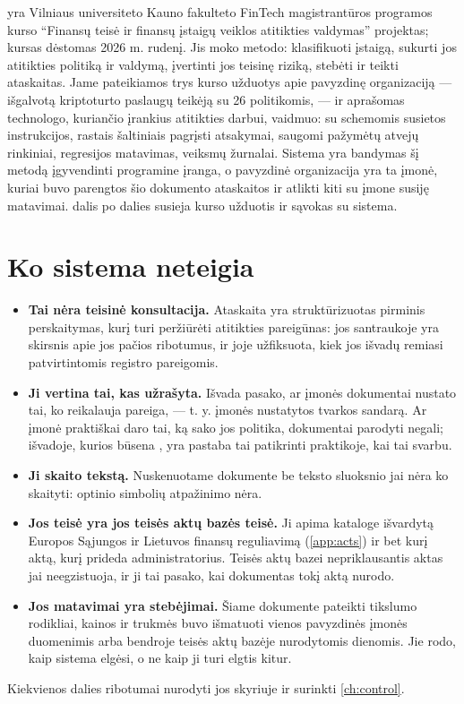 \product{} yra Vilniaus universiteto Kauno fakulteto FinTech magistrantūros programos kurso
\enquote{Finansų teisė ir finansų įstaigų veiklos atitikties valdymas} projektas; kursas dėstomas
2026 m. rudenį. Jis moko metodo: klasifikuoti įstaigą, sukurti jos atitikties politiką ir
valdymą, įvertinti jos teisinę riziką, stebėti ir teikti ataskaitas. Jame pateikiamos trys
kurso užduotys apie pavyzdinę organizaciją \demo{} --- išgalvotą kriptoturto paslaugų teikėją
su 26 politikomis, --- ir aprašomas technologo, kuriančio įrankius atitikties darbui,
vaidmuo: su schemomis susietos instrukcijos, rastais šaltiniais pagrįsti atsakymai, saugomi
pažymėtų atvejų rinkiniai, regresijos matavimas, veiksmų žurnalai. Sistema yra bandymas šį
metodą įgyvendinti programine įranga, o pavyzdinė organizacija yra ta įmonė, kuriai buvo
parengtos šio dokumento ataskaitos ir atlikti kiti su įmone susiję matavimai.
 dalis po dalies susieja kurso užduotis ir sąvokas su sistema.

\section{Ko sistema neteigia}\label{sec:intro:limits}

\begin{itemize}
  \item \textbf{Tai nėra teisinė konsultacija.} Ataskaita yra struktūrizuotas pirminis
    perskaitymas, kurį turi peržiūrėti atitikties pareigūnas: jos santraukoje yra skirsnis
    apie jos pačios ribotumus, ir joje užfiksuota, kiek jos išvadų remiasi patvirtintomis
    registro pareigomis.
  \item \textbf{Ji vertina tai, kas užrašyta.} Išvada pasako, ar įmonės dokumentai nustato
    tai, ko reikalauja pareiga, --- t. y. įmonės nustatytos tvarkos sandarą. Ar įmonė praktiškai daro tai,
    ką sako jos politika, dokumentai parodyti negali; išvadoje, kurios būsena
    , yra pastaba tai patikrinti praktikoje, kai tai svarbu.
  \item \textbf{Ji skaito tekstą.} Nuskenuotame dokumente be teksto sluoksnio jai nėra ko
    skaityti: optinio simbolių atpažinimo nėra.
  \item \textbf{Jos teisė yra jos teisės aktų bazės teisė.} Ji apima kataloge išvardytą
    Europos Sąjungos ir Lietuvos finansų reguliavimą (\cref{app:acts}) ir bet kurį aktą,
    kurį prideda administratorius. Teisės aktų bazei nepriklausantis aktas jai neegzistuoja,
    ir ji tai pasako, kai dokumentas tokį aktą nurodo.
  \item \textbf{Jos matavimai yra stebėjimai.} Šiame dokumente pateikti tikslumo rodikliai,
    kainos ir trukmės buvo išmatuoti vienos pavyzdinės įmonės duomenimis arba bendroje teisės aktų bazėje
    nurodytomis dienomis. Jie rodo, kaip sistema elgėsi, o ne kaip ji turi elgtis kitur.
\end{itemize}

Kiekvienos dalies ribotumai nurodyti jos skyriuje ir surinkti \cref{ch:control}.
